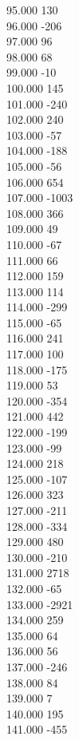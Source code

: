 { 95.000	130 \\
 96.000	-206 \\
 97.000	96 \\
 98.000	68 \\
 99.000	-10 \\
 100.000	145 \\
 101.000	-240 \\
 102.000	240 \\
 103.000	-57 \\
 104.000	-188 \\
 105.000	-56 \\
 106.000	654 \\
 107.000	-1003 \\
 108.000	366 \\
 109.000	49 \\
 110.000	-67 \\
 111.000	66 \\
 112.000	159 \\
 113.000	114 \\
 114.000	-299 \\
 115.000	-65 \\
 116.000	241 \\
 117.000	100 \\
 118.000	-175 \\
 119.000	53 \\
 120.000	-354 \\
 121.000	442 \\
 122.000	-199 \\
 123.000	-99 \\
 124.000	218 \\
 125.000	-107 \\
 126.000	323 \\
 127.000	-211 \\
 128.000	-334 \\
 129.000	480 \\
 130.000	-210 \\
 131.000	2718 \\
 132.000	-65 \\
 133.000	-2921 \\
 134.000	259 \\
 135.000	64 \\
 136.000	56 \\
 137.000	-246 \\
 138.000	84 \\
 139.000	7 \\
 140.000	195 \\
 141.000	-455 \\
}
